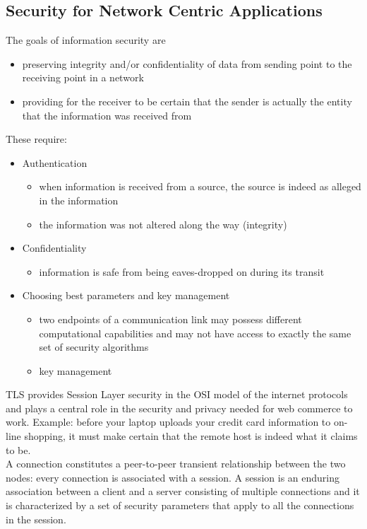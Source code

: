 \documentclass[a4paper, 10pt, titlepage]{article}
\begin{document}
\subsection{Security for Network Centric Applications}
The goals of information security are
\begin{itemize}
\item preserving integrity and/or confidentiality of data from sending point to the receiving point in a network
\item providing for the receiver to be certain that the sender is actually the entity that the information was received from
\end{itemize} 
These require:
\begin{itemize}
\item Authentication
	\begin{itemize}
	\item when information is received from a source, the source is indeed as alleged in the information
	\item the information was not altered along the way (integrity)
	\end{itemize}
\item Confidentiality
	\begin{itemize}
	\item information is safe from being eaves-dropped on during its transit
	\end{itemize}
\item Choosing best parameters and key management
	\begin{itemize}
	\item two endpoints of a communication link may possess different computational capabilities and may not
have access to exactly the same set of security algorithms
	\item key management
	\end{itemize}
\end{itemize}
TLS provides Session Layer security in the OSI model of the internet protocols and plays a central role in the security and privacy needed for web commerce to work. Example: before your laptop uploads your credit card information to on-line shopping, it must make certain that the remote host is indeed what it claims to be. \medskip\\
A connection constitutes a peer-to-peer transient relationship between the two nodes: every connection is associated with a session. A session is an enduring association between a client and a server consisting of multiple connections and it is characterized by a set of security parameters that apply to all the connections in the session.
\end{document}
